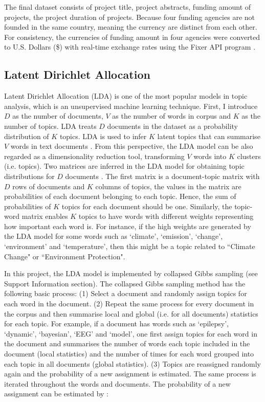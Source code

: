 The final dataset consists of project title, project abstracts, funding amount of projects, the project duration of projects. Because four funding agencies are not founded in the same country, meaning the currency are distinct from each other. For consistency, the currencies of funding amount in four agencies were converted to U.S. Dollars (\$) with real-time exchange rates using the Fixer API program \cite{fixer}.

\subsection{Latent Dirichlet Allocation}

Latent Dirichlet Allocation (LDA) is one of the most popular models in topic analysis, which is an unsupervised machine learning technique. First, I introduce $D$ as the number of documents, $V$ as the number of words in corpus and $K$ as the number of topics. LDA treats $D$ documents in the dataset as a probability distribution of $K$ topics. LDA is used to infer $K$ latent topics that can summarise $V$ words in text documents \cite{sseutm}. From this perspective, the LDA model can be also regarded as a dimensionality reduction tool, transforming $V$ words into $K$ clusters (i.e. topics). Two matrices are inferred in the LDA model for obtaining topic distributions for $D$ documents \cite{LDA}. The first matrix is a document-topic matrix with $D$ rows of documents and $K$ columns of topics, the values in the matrix are probabilities of each document belonging to each topic. Hence, the sum of probabilities of $K$ topics for each document should be one. Similarly, the topic-word matrix enables $K$ topics to have words with different weights representing how important each word is. For instance, if the high weights are generated by the LDA model for some words such as `climate', `emission', `change', `environment' and `temperature', then this might be a topic related to ``Climate Change" or ``Environment Protection".

In this project, the LDA model is implemented by collapsed Gibbs sampling (see Support Information section). The collapsed Gibbs sampling method has the following basic process: (1) Select a document and randomly assign topics for each word in the document. (2) Repeat the same process for every document in the corpus and then summarise local and global (i.e. for all documents) statistics for each topic. For example, if a document has words such as `epilepsy', `dynamic', `bayesian', `EEG' and `model', one ﬁrst assign topics for each word in the document and summarises the number of words each topic included in the document (local statistics) and the number of times for each word grouped into each topic in all documents (global statistics). (3) Topics are reassigned randomly again and the probability of a new assignment is estimated. The same process is iterated throughout the words and documents. The probability of a new assignment can be estimated by \cite{gibbs_lda}:

